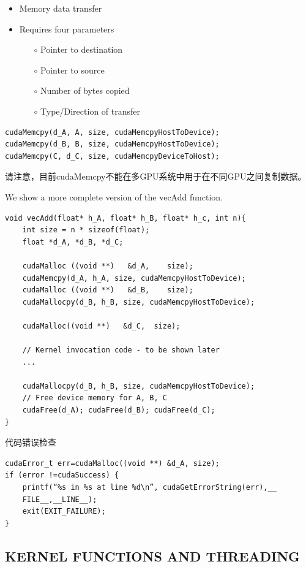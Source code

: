 \documentclass[11pt]{ctexart}
\begin{document}
\begin{itemize}
	\item Memory data transfer
	\item Requires four parameters
	\begin{itemize}
		\item[$\circ$] Pointer to destination
		\item[$\circ$] Pointer to source
		\item[$\circ$] Number of bytes copied
		\item [$\circ$] Type/Direction of transfer
		\end{itemize}
\end{itemize}

\begin{lstlisting}
cudaMemcpy(d_A, A, size, cudaMemcpyHostToDevice);
cudaMemcpy(d_B, B, size, cudaMemcpyHostToDevice);
cudaMemcpy(C, d_C, size, cudaMemcpyDeviceToHost);
\end{lstlisting}



请注意，目前cudaMemcpy不能在多GPU系统中用于在不同GPU之间复制数据。

We show a more complete version of the vecAdd function.

\begin{lstlisting}
void vecAdd(float* h_A, float* h_B, float* h_c, int n){
	int size = n * sizeof(float);
	float *d_A, *d_B, *d_C;
	
	cudaMalloc ((void **)   &d_A,    size);
	cudaMemcpy(d_A, h_A, size, cudaMemcpyHostToDevice);
	cudaMalloc ((void **)   &d_B,    size);
	cudaMallocpy(d_B, h_B, size, cudaMemcpyHostToDevice);
	
	cudaMalloc((void **)   &d_C,  size);
	
	// Kernel invocation code - to be shown later
	...
	
	cudaMallocpy(d_B, h_B, size, cudaMemcpyHostToDevice);
	// Free device memory for A, B, C
	cudaFree(d_A); cudaFree(d_B); cudaFree(d_C);
} 
\end{lstlisting}

代码错误检查

\begin{lstlisting}
cudaError_t err=cudaMalloc((void **) &d_A, size);
if (error !=cudaSuccess) {
	printf(“%s in %s at line %d\n”, cudaGetErrorString(err),__
	FILE__,__LINE__);
	exit(EXIT_FAILURE);
}
\end{lstlisting}


\subsection{KERNEL FUNCTIONS AND THREADING}
\end{document}
